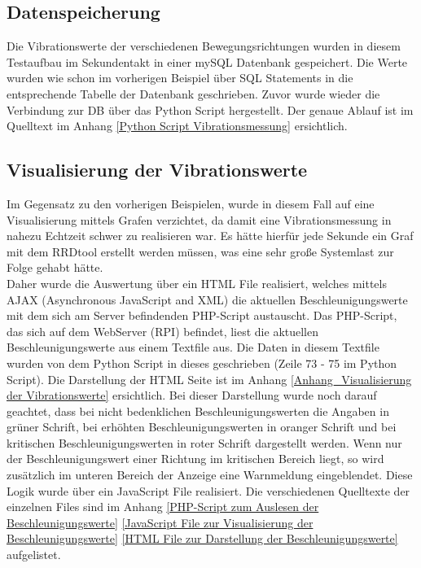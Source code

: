 \subsection{Datenspeicherung}
\label{subsection_Speicherung_der_Vibrationsdaten}
Die Vibrationswerte der verschiedenen Bewegungsrichtungen wurden in diesem Testaufbau im Sekundentakt in einer mySQL Datenbank gespeichert. Die Werte wurden wie schon im vorherigen Beispiel über SQL Statements in die entsprechende Tabelle der Datenbank geschrieben. Zuvor wurde wieder die Verbindung zur DB über das Python Script hergestellt. Der genaue Ablauf ist im Quelltext im Anhang \ref{Python Script Vibrationsmessung} ersichtlich.

\subsection{Visualisierung der Vibrationswerte}
\label{subsection_Visualisierung der Vibrationswerte}
Im Gegensatz zu den vorherigen Beispielen, wurde in diesem Fall auf eine Visualisierung mittels Grafen verzichtet, da damit eine Vibrationsmessung in nahezu Echtzeit schwer zu realisieren war. Es hätte hierfür jede Sekunde ein Graf mit dem RRDtool erstellt werden müssen, was eine sehr große Systemlast zur Folge gehabt hätte.\\
Daher wurde die Auswertung über ein HTML File realisiert, welches mittels AJAX (Asynchronous JavaScript and XML) die aktuellen Beschleunigungswerte mit dem sich am Server befindenden PHP-Script austauscht. Das PHP-Script, das sich auf dem WebServer (\ac{RPI}) befindet, liest die aktuellen Beschleunigungswerte aus einem Textfile aus. Die Daten in diesem Textfile wurden von dem Python Script in dieses geschrieben (Zeile 73 - 75 im Python Script). Die Darstellung der HTML Seite ist im Anhang \ref{Anhang_Visualisierung der Vibrationswerte} ersichtlich. Bei dieser Darstellung wurde noch darauf geachtet, dass bei nicht bedenklichen Beschleunigungswerten die Angaben in grüner Schrift, bei erhöhten Beschleunigungswerten in oranger Schrift und bei kritischen Beschleunigungswerten in roter Schrift dargestellt werden. Wenn nur der Beschleunigungswert einer Richtung im kritischen Bereich liegt, so wird zusätzlich im unteren Bereich der Anzeige eine Warnmeldung eingeblendet. Diese Logik wurde über ein JavaScript File realisiert. Die verschiedenen Quelltexte der einzelnen Files sind im Anhang   \ref{PHP-Script zum Auslesen der Beschleunigungswerte} \ref{JavaScript File zur Visualisierung der Beschleunigungswerte} \ref{HTML File zur Darstellung der Beschleunigungswerte} aufgelistet. 

